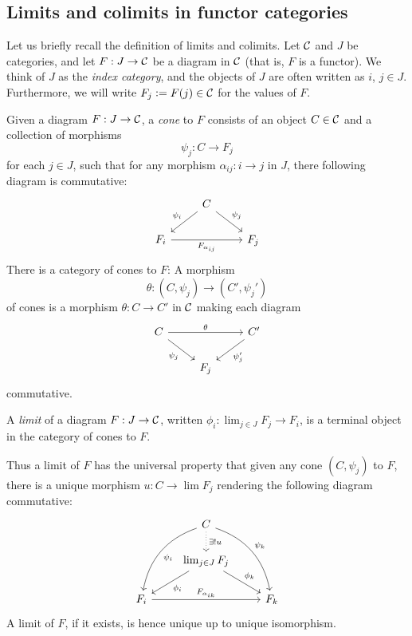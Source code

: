 \subsection{Limits and colimits in functor categories}
Let us briefly recall the definition of limits and colimits. Let $\mathcal{C}$ and $J$ be categories, and let $F:J\to\mathcal{C}$ be a diagram in $\mathcal{C}$ (that is, $F$ is a functor). We think of $J$ as the \emph{index category}, and the objects of $J$ are often written as $i$, $j\in J$. Furthermore, we will write $F_j\vcentcolon= F(j)\in\mathcal{C}$ for the values of $F$.

\begin{definition}[Cones]
Given a diagram $F:J\to\mathcal{C}$, a \emph{cone} to $F$ consists of an object $C\in\mathcal{C}$ and a collection of morphisms
\[
\psi_j:C\to F_j
\]for each $j\in J$, such that for any morphism $\alpha_{ij}:i\to j$ in $J$, there following diagram is commutative:
\[\begin{tikzcd}
& C\arrow{ld}[swap]{\psi_i}\arrow{rd}{\psi_j}\\
F_i\arrow{rr}[swap]{F_{\alpha_{ij}}} & & F_j
\end{tikzcd}\]
There is a category of cones to $F$: A morphism
\[
\theta:(C,\psi_j)\to(C',\psi_j')
\]of cones is a morphism $\theta:C\to C'$ in $\mathcal{C}$ making each diagram
\[\begin{tikzcd}
C\arrow{rr}{\theta}\arrow{rd}[swap]{\psi_j} & & C'\arrow{ld}{\psi_j'}\\
& F_j &
\end{tikzcd}\]commutative.
\end{definition}

\begin{definition}
A \emph{limit} of a diagram $F:J\to\mathcal{C}$, written $\phi_i:\lim_{j\in J}F_j\to F_i$, is a terminal object in the category of cones to $F$.
\end{definition}
Thus a limit of $F$ has the universal property that given any cone $(C,\psi_j)$ to $F$, there is a unique morphism $u:C\to\lim F_j$ rendering the following diagram commutative:
\[\begin{tikzcd}
& C
\arrow[ddr, bend left, "\psi_k"]
\arrow[ddl, bend right, "\psi_i"]
\arrow[d, dotted, "\exists!u"] &  \\
 & \lim_{j\in J}F_j\arrow[dr, "\phi_k"]\arrow[dl, "\phi_i"] & \\
F_i\arrow[rr, "F_{\alpha_{ik}}"] & &F_k
\end{tikzcd}\]
A limit of $F$, if it exists, is hence unique up to unique isomorphism.


